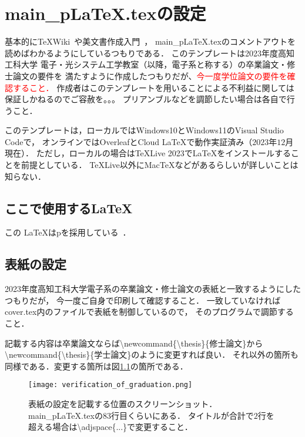 \chapter{main\_pLaTeX.texの設定}
基本的に\TeX Wiki~\cite{platex}や美文書作成入門~\cite{美文書作成入門}，
main\_pLaTeX.texのコメントアウトを読めばわかるようにしているつもりである．
このテンプレートは2023年度高知工科大学 電子・光システム工学教室（以降，電子系と称する）の卒業論文・修士論文の要件を
満たすように作成したつもりだが、\textcolor{red}{今一度学位論文の要件を確認すること．}
作成者はこのテンプレートを用いることによる不利益に関しては保証しかねるのでご容赦を。。。
プリアンブルなどを調節したい場合は各自で行うこと．

このテンプレートは，ローカルではWindows10とWindows11のVisual Studio Codeで，
オンラインではOverleafとCloud LaTeXで動作実証済み（$2023$年$12$月現在）．
ただし，ローカルの場合は\TeX Live 2023で\LaTeX をインストールすることを前提としている．
\TeX Live以外にMac\TeX などがあるらしいが詳しいことは知らない．

\section{ここで使用する\LaTeX}
この \LaTeX はp\LaTeXe を採用している~\cite{美文書作成入門}．

\section{表紙の設定}
2023年度高知工科大学電子系の卒業論文・修士論文の表紙と一致するようにしたつもりだが，
今一度ご自身で印刷して確認すること．
一致していなければcover.tex内のファイルで表紙を制御しているので，
そのプログラムで調節すること．

記載する内容は卒業論文ならば\textbackslash newcommand\{\textbackslash thesis\}\{修士論文\}から
\textbackslash newcommand\{\textbackslash thesis\}\{学士論文\}のように変更すれば良い．
それ以外の箇所も同様である．変更する箇所は図\ref{fig:cover}の箇所である．

\begin{figure}[h]
  \centering
  \texttt{[image: verification\_of\_graduation.png]}
  \caption{
    表紙の設定を記載する位置のスクリーンショット．main\_pLaTeX.texの$83$行目くらいにある．
    タイトルが合計で$2$行を超える場合は\textbackslash adjspace\{...\}で変更すること．}
  \label{fig:cover}
\end{figure}

